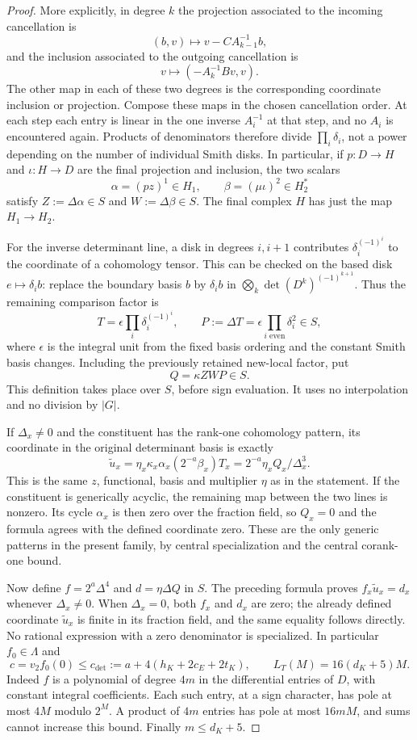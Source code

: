 \documentclass[11pt]{article}
\theoremstyle{definition}
\theoremstyle{remark}
\begin{document}
\begin{proof}
More explicitly, in degree $k$ the projection associated to the
incoming cancellation is
\[
 (b,v)\longmapsto v-C A_{k-1}^{-1}b,
\]
and the inclusion associated to the outgoing cancellation is
\[
 v\longmapsto(-A_k^{-1}Bv,v).
\]
The other map in each of these two degrees is the corresponding
coordinate inclusion or projection.  Compose these maps in the
chosen cancellation order.  At each step each entry is linear in
the one inverse $A_i^{-1}$ at that step, and no $A_i$ is encountered
again.  Products of denominators therefore divide $\prod_i\delta_i$,
not a power depending on the number of individual Smith disks.
In particular, if $p:D\to H$ and $\iota:H\to D$ are the final
projection and inclusion, the two scalars
\[
 \alpha=(pz)^1\in H_1,
 \qquad \beta=(\mu\iota)^2\in H_2^*
\]
satisfy $Z:=\Delta\alpha\in S$ and $W:=\Delta\beta\in S$.
The final complex $H$ has just the map $H_1\to H_2$.

For the inverse determinant line, a disk in degrees $i,i+1$
contributes $\delta_i^{(-1)^i}$ to the coordinate of a cohomology
tensor.  This can be checked on the based disk
$e\mapsto\delta_i b$: replace the boundary basis $b$ by
$\delta_i b$ in $\bigotimes_k\det(D^k)^{(-1)^{k+1}}$.
Thus the remaining comparison factor is
\[
 T=\epsilon\prod_i\delta_i^{(-1)^i},\qquad
 P:=\Delta T=\epsilon\prod_{i\text{ even}}\delta_i^2\in S,
\]
where $\epsilon$ is the integral unit from the fixed basis ordering
and the constant Smith basis changes.  Including the previously
retained new-local factor, put
\[
 Q=\kappa ZWP\in S.
\]
This definition takes place over $S$, before sign evaluation.  It
uses no interpolation and no division by $|G|$.

If $\Delta_x\ne0$ and the constituent has the rank-one cohomology
pattern, its coordinate in the original determinant basis is exactly
\[
 \widetilde u_x=\eta_x\kappa_x\alpha_x(2^{-a}\beta_x)T_x
              =2^{-a}\eta_xQ_x/\Delta_x^3.
\]
This is the same $z$, functional, basis and multiplier $\eta$ as in
the statement.  If the constituent is generically acyclic, the
remaining map between the two lines is nonzero.  Its cycle
$\alpha_x$ is then zero over the fraction field, so $Q_x=0$ and the
formula agrees with the defined coordinate zero.  These are the
only generic patterns in the present family, by central
specialization and the central corank-one bound.

Now define $f=2^a\Delta^4$ and $d=\eta\Delta Q$ in $S$.
The preceding formula proves $f_x\widetilde u_x=d_x$ whenever
$\Delta_x\ne0$.  When $\Delta_x=0$, both $f_x$ and $d_x$ are zero;
the already defined coordinate $\widetilde u_x$ is finite in its
fraction field, and the same equality follows directly.  No rational
expression with a zero denominator is specialized.  In particular
$f_0\in\Lambda$ and
\[
 c=v_2f_0(0)\le c_{\det}:=a+4(h_K+2c_E+2t_K),\qquad
 L_T(M)=16(d_K+5)M.                                      \tag{5.9}
\]
Indeed $f$ is a polynomial of degree $4m$ in the differential
entries of $D$, with constant integral coefficients.  Each such
entry, at a sign character, has pole at most $4M$ modulo $2^M$.
A product of $4m$ entries has pole at most $16mM$, and sums cannot
increase this bound.  Finally $m\le d_K+5$.


\end{proof}
\end{document}
